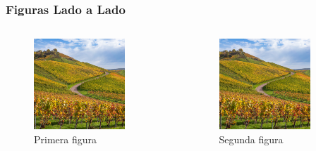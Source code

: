 \documentclass{pt-slides}
\begin{document}
\begin{frame}
    \frametitle{Figuras Lado a Lado}

    \begin{columns}
        \begin{column}{0.48\textwidth}
            \begin{figure}
                \centering
                \includegraphics[width=0.8\textwidth]{figures/background}
                \caption{Primera figura}
            \end{figure}
        \end{column}
        \begin{column}{0.48\textwidth}
            \begin{figure}
                \centering
                \includegraphics[width=0.8\textwidth]{figures/background}
                \caption{Segunda figura}
            \end{figure}
        \end{column}
    \end{columns}
\end{frame}
\end{document}
